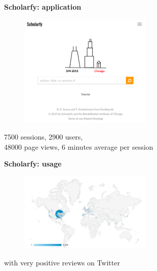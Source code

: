 \begin{frame}{\textbf{Scholarfy: application}}

\begin{figure}
\href{http://www.scholarfy.net}{\includegraphics[width=2.5in]{images/scholarfy}}\\
\end{figure}

7500 sessions, 2900 users, \\
48000 page views, 6 minutes average per session

\end{frame}


\begin{frame}{\textbf{Scholarfy: usage}}

\begin{figure}
\includegraphics[width=2.5in]{images/scholarfy_map}\\
\end{figure}

with very positive reviews on Twitter

\end{frame}



